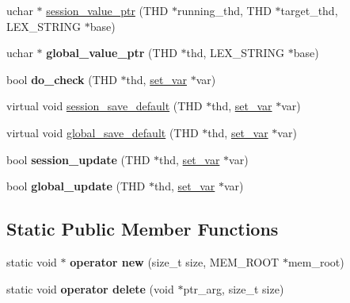 \begin{DoxyCompactItemize}
\item 
uchar $\ast$ \mbox{\hyperlink{classsys__var__pluginvar_a0a0dba9347c308d1dc9f2b177e29e1ef}{session\+\_\+value\+\_\+ptr}} (T\+HD $\ast$running\+\_\+thd, T\+HD $\ast$target\+\_\+thd, L\+E\+X\+\_\+\+S\+T\+R\+I\+NG $\ast$base)
\item 
\mbox{\label{classsys__var__pluginvar_a3fbf8f06e9b46a4fe61152115954e5a6}} 
uchar $\ast$ {\bfseries global\+\_\+value\+\_\+ptr} (T\+HD $\ast$thd, L\+E\+X\+\_\+\+S\+T\+R\+I\+NG $\ast$base)
\item 
\mbox{\label{classsys__var__pluginvar_a012519865c930e6a29eded2202257eb5}} 
bool {\bfseries do\+\_\+check} (T\+HD $\ast$thd, \mbox{\hyperlink{classset__var}{set\+\_\+var}} $\ast$var)
\item 
virtual void \mbox{\hyperlink{classsys__var__pluginvar_a7e3931116eeeeeaa4c43d17c1554c92d}{session\+\_\+save\+\_\+default}} (T\+HD $\ast$thd, \mbox{\hyperlink{classset__var}{set\+\_\+var}} $\ast$var)
\item 
virtual void \mbox{\hyperlink{classsys__var__pluginvar_abd689ffd6c8f1915085065a751573284}{global\+\_\+save\+\_\+default}} (T\+HD $\ast$thd, \mbox{\hyperlink{classset__var}{set\+\_\+var}} $\ast$var)
\item 
\mbox{\label{classsys__var__pluginvar_a873d1181be6c1903afc06420e1208bd5}} 
bool {\bfseries session\+\_\+update} (T\+HD $\ast$thd, \mbox{\hyperlink{classset__var}{set\+\_\+var}} $\ast$var)
\item 
\mbox{\label{classsys__var__pluginvar_a3334a9a63627b8c32c8a3858d86e5793}} 
bool {\bfseries global\+\_\+update} (T\+HD $\ast$thd, \mbox{\hyperlink{classset__var}{set\+\_\+var}} $\ast$var)
\end{DoxyCompactItemize}
\subsection*{Static Public Member Functions}
\begin{DoxyCompactItemize}
\item 
\mbox{\label{classsys__var__pluginvar_af78ab28ea17ec0e50e425924ac3e5230}} 
static void $\ast$ {\bfseries operator new} (size\+\_\+t size, M\+E\+M\+\_\+\+R\+O\+OT $\ast$mem\+\_\+root)
\item 
\mbox{\label{classsys__var__pluginvar_a8aa90c8b9e4d52c333662f93789b117e}} 
static void {\bfseries operator delete} (void $\ast$ptr\+\_\+arg, size\+\_\+t size)
\end{DoxyCompactItemize}
